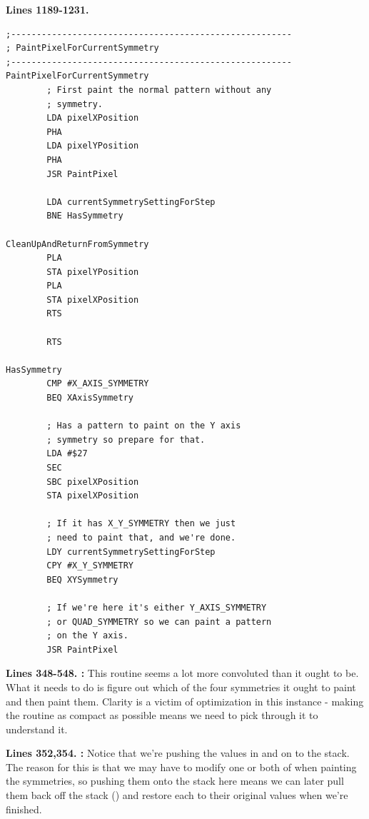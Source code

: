 \clearpage
\textbf{Lines 1189-1231. }
\begin{lstlisting}
;-------------------------------------------------------
; PaintPixelForCurrentSymmetry
;-------------------------------------------------------
PaintPixelForCurrentSymmetry   
        ; First paint the normal pattern without any
        ; symmetry.
        LDA pixelXPosition
        PHA 
        LDA pixelYPosition
        PHA 
        JSR PaintPixel

        LDA currentSymmetrySettingForStep
        BNE HasSymmetry

CleanUpAndReturnFromSymmetry   
        PLA 
        STA pixelYPosition
        PLA 
        STA pixelXPosition
        RTS 

        RTS

HasSymmetry   
        CMP #X_AXIS_SYMMETRY
        BEQ XAxisSymmetry

        ; Has a pattern to paint on the Y axis
        ; symmetry so prepare for that.
        LDA #$27
        SEC 
        SBC pixelXPosition
        STA pixelXPosition

        ; If it has X_Y_SYMMETRY then we just 
        ; need to paint that, and we're done.
        LDY currentSymmetrySettingForStep
        CPY #X_Y_SYMMETRY
        BEQ XYSymmetry

        ; If we're here it's either Y_AXIS_SYMMETRY
        ; or QUAD_SYMMETRY so we can paint a pattern
        ; on the Y axis.
        JSR PaintPixel

\end{lstlisting}
\clearpage

\textbf{Lines 348-548. :} This routine seems a lot more convoluted than it
ought to be. What it needs to do is figure out which of the four symmetries it ought to paint and then paint them. Clarity
is a victim of optimization in this instance - making the routine as compact as possible means we need to pick through it
to understand it.

\textbf{Lines 352,354. :} Notice that we're pushing the values in  and 
on to the stack. The reason for this is that we may have to modify one or both of  when
painting the symmetries, so pushing them onto the stack here means we can later pull them back off the stack () and restore each to their original
values when we're finished.

